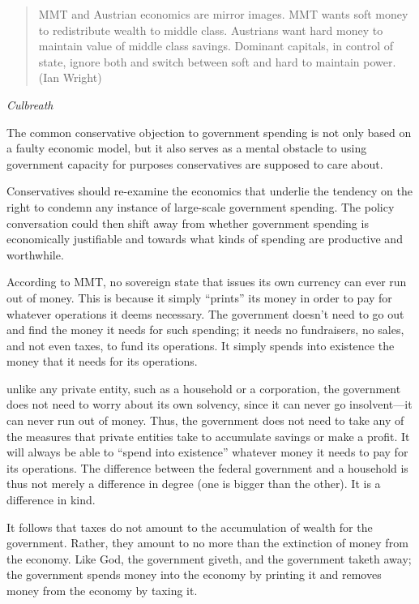 \documentclass[
]{book}
\begin{document}
\begin{quote}
MMT and Austrian economics are mirror images. MMT wants soft money to redistribute wealth to middle class. Austrians want hard money to maintain value of middle class savings. Dominant capitals, in control of state, ignore both and switch between soft and hard to maintain power. (Ian Wright)
\end{quote}

\emph{Culbreath}

The common conservative objection to government spending is not only based on a faulty economic model, but it also serves as a mental obstacle to using government capacity for purposes conservatives are supposed to care about.

Conservatives should re-examine the economics that underlie the tendency on the right to condemn any instance of large-scale government spending.
The policy conversation could then shift away from whether government spending is economically justifiable and towards what kinds of spending are productive and worthwhile.

According to MMT, no sovereign state that issues its own currency can ever run out of money. This is because it simply ``prints'' its money in order to pay for whatever operations it deems necessary. The government doesn't need to go out and find the money it needs for such spending; it needs no fundraisers, no sales, and not even taxes, to fund its operations. It simply spends into existence the money that it needs for its operations.

unlike any private entity, such as a household or a corporation, the government does not need to worry about its own solvency, since it can never go insolvent---it can never run out of money. Thus, the government does not need to take any of the measures that private entities take to accumulate savings or make a profit. It will always be able to ``spend into existence'' whatever money it needs to pay for its operations. The difference between the federal government and a household is thus not merely a difference in degree (one is bigger than the other). It is a difference in kind.

It follows that taxes do not amount to the accumulation of wealth for the government. Rather, they amount to no more than the extinction of money from the economy. Like God, the government giveth, and the government taketh away; the government spends money into the economy by printing it and removes money from the economy by taxing it.
\end{document}
